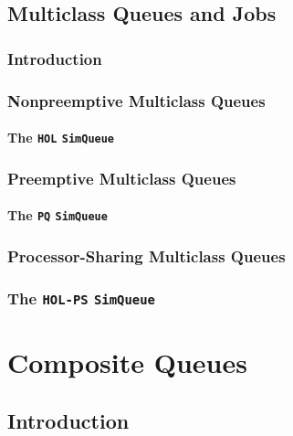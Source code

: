 \documentclass[12pt]{book}
\begin{document}
\section{Multiclass Queues and Jobs}
\label{sec:multiclass}

\subsection{Introduction}
\label{sec:multiclass-introduction}

\subsection{Nonpreemptive Multiclass Queues}
\label{sec:multiclass-nonpreemptive}

\subsubsection{The \lstinline{HOL} \lstinline{SimQueue}}
\label{sec:HOL}

\subsection{Preemptive Multiclass Queues}
\label{sec:multiclass-preemptive}

\subsubsection{The \lstinline{PQ} \lstinline{SimQueue}}
\label{sec:PQ}

\subsection{Processor-Sharing Multiclass Queues}
\label{sec:multiclass-processorsharing}

\subsection{The \lstinline{HOL-PS} \lstinline{SimQueue}}
\label{sec:HOL-PS}

\chapter{Composite Queues}
\label{chap:composite}

\section{Introduction}
\end{document}

